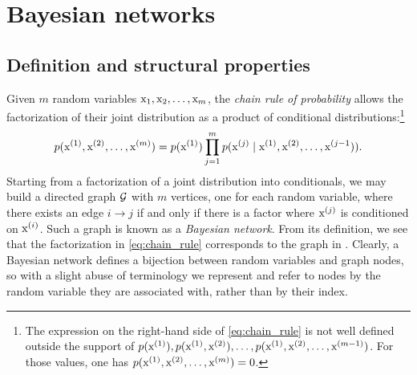 \section{Bayesian networks}
\label{sec:bayesian_networks}

\subsection{Definition and structural properties}
\label{sec:bayesian_net_definition}

Given $m$ random variables ${\textnormal{x}}_1, {\textnormal{x}}_2, \dots, {\textnormal{x}}_m$, the \emph{chain rule of probability} allows the factorization of their joint distribution as a product of conditional distributions:\footnote{The expression on the right-hand side of \eqref{eq:chain_rule} is not well defined outside the support of $p({\textnormal{x}}^{(1)}), p({\textnormal{x}}^{(1)}, {\textnormal{x}}^{(2)}), \dots, p({\textnormal{x}}^{(1)}, {\textnormal{x}}^{(2)}, \dots, {\textnormal{x}}^{(m-1)})$. For those values, one has $p({\textnormal{x}}^{(1)}, {\textnormal{x}}^{(2)}, \dots, {\textnormal{x}}^{(m)})=0$.}
\begin{equation}
    \label{eq:chain_rule}
    p({\textnormal{x}}^{(1)},{\textnormal{x}}^{(2)},\dots,{\textnormal{x}}^{(m)}) = p({\textnormal{x}}^{(1)}) \prod_{j=1}^m p({\textnormal{x}}^{(j)} \mid {\textnormal{x}}^{(1)}, {\textnormal{x}}^{(2)}, \dots, {\textnormal{x}}^{(j-1})).
\end{equation}
Starting from a factorization of a joint distribution into conditionals, we may build a directed graph ${\mathcal{G}}$ with $m$ vertices, one for each random variable, where there exists an edge $i \rightarrow j$ if and only if there is a factor where ${\textnormal{x}}^{(j)}$ is conditioned on ${\textnormal{x}}^{(i)}$. Such a graph is known as a \emph{Bayesian network}. From its definition, we see that the factorization in \eqref{eq:chain_rule} corresponds to the graph in . Clearly, a Bayesian network defines a bijection between random variables and graph nodes, so with a slight abuse of terminology we represent and refer to nodes by the random variable they are associated with, rather than by their index.

